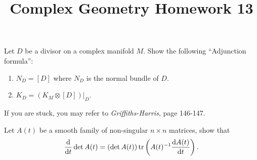 \documentclass[12pt]{article}
\title{Complex Geometry Homework 13}
\author{}
\date{}
\begin{document}
\maketitle
\begin{problem}
  Let \(D\) be a divisor on a complex manifold \(M\). Show the following
  ``Adjunction formula'':
  \begin{enumerate}[1)]
  \item \(N_D=[D]\) where \(N_D\) is the normal bundle of \(D\).
  \item \(K_D=\left(K_M\otimes [D]\right)\big|_{D}\).
  \end{enumerate}
  If you are stuck, you may refer to \emph{Griffiths-Harris}, page 146-147.
\end{problem}
\begin{problem}
  Let \(A(t)\) be a smooth family of non-singular \(n\times n\) matrices, show that \[
    \dv{}{t}\det A(t)=(\det A(t))\op{tr} \left(A(t)^{-1}\dv{A(t)}{t}\right)
  .\] 
\end{problem}
\end{document}
